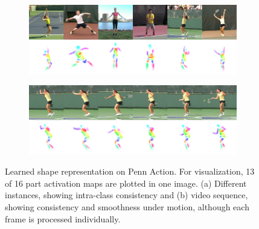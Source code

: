 \begin{figure}[t]
	\begin{subfigure}{0.5\textwidth}
	\centering
	\includegraphics[trim={0cm 0cm 0cm 0cm},clip, width=1.\linewidth]{fig/shape6white}\caption{}
	\label{fig:shape_penn}
	\end{subfigure}
	\begin{subfigure}{0.5\textwidth}
	\centering
	\includegraphics[trim={0cm 0cm 0cm 0cm},clip, width=1.\linewidth]{fig/shape_tennis}\caption{}
	\label{fig:shape_tennis}
	\end{subfigure}
	\caption{Learned shape representation on Penn Action. For visualization, 13 of 16 part activation maps are plotted in one image. (a) Different instances, showing intra-class consistency and (b) video sequence, showing consistency and smoothness under motion, although each frame is processed individually.}
	\label{fig:shape}
\end{figure}

